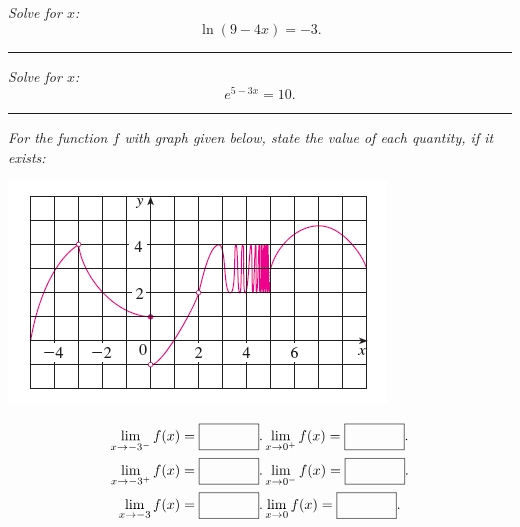 \documentclass[12pt]{article}
\begin{document}
\bigskip
{\problem[5 pts] \em Solve for $x$:} \begin{equation*} \ln(9-4x) = -3.\end{equation*}
\vspace{2cm}
\begin{flushright}
\end{flushright}
\hrule
{\problem[5 pts] \em Solve for $x$:} 
\begin{equation*}e^{5-3x} = 10.\end{equation*}
\vspace{2cm}
\begin{flushright}
\end{flushright}
\hrule
{\problem[10 pts] \em For the function $f$ with graph given below, state the value of each quantity, if it exists:}
\begin{center} 
\includegraphics[width=0.5\linewidth]{gftest1}
\end{center}
\begin{eqnarray*}
\lim_{x\to -3^-} f(x)= \fbox{\hspace{0.5in}\strut}. & \lim_{x\to 0^+} f(x)= \fbox{\hspace{0.5in}\strut}. \\
\lim_{x\to -3^+} f(x)= \fbox{\hspace{0.5in}\strut}. & \lim_{x\to 0^-} f(x)=\fbox{\hspace{0.5in}\strut}. \\
\lim_{x\to -3} f(x)  = \fbox{\hspace{0.5in}\strut}.& \lim_{x \to 0} f(x)= \fbox{\hspace{0.5in}\strut}.
\end{eqnarray*}

\newpage
\end{document}
